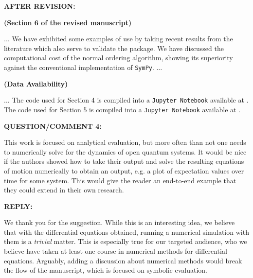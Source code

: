 \documentclass[12pt, a4paper]{article}
\newenvironment{revision}{%
\color{red}
}
{}
\newenvironment{revq}[1]{%
\newpage\phantomsection
\color{RoyalPurple}
\par
\textbf{QUESTION/COMMENT {#1}:}
\par
}
{\bigskip}
\newenvironment{reva}{%
\color{Black}
\par
\textbf{REPLY:}
\par
}
{\bigskip}
\newenvironment{revpost}{%
\textbf{{AFTER REVISION:}}
\par
}
{}
\begin{document}
\begin{revpost}
\textbf{(Section 6 of the revised manuscript)}

$\dots$ We have exhibited some examples of use by taking recent results from the literature which also serve to validate the package. We have discussed the computational cost of the normal ordering algorithm, \begin{revision}showing its superiority against the conventional implementation of \texttt{SymPy}.\end{revision} $\dots$

\textbf{(Data Availability)}

$\dots$ The code used for Section 4 is compiled into a \texttt{Jupyter Notebook} available at \href{https://github.com/hendry24/pyBoLaNO/blob/main/tutorial.ipynb}{}. \begin{revision}The code used for Section 5 is compiled into a \texttt{Jupyter Notebook} available at \href{https://github.com/hendry24/pyBoLaNO/blob/main/benchmarks.ipynb}{}.\end{revision}

\end{revpost}


\begin{revq}{4}
This work is focused on analytical evaluation, but more often than not one needs to numerically solve for the dynamics of open quantum systems. It would be nice if the authors showed how to take their output and solve the resulting equations of motion numerically to obtain an output, e.g. a plot of expectation values over time for some system. This would give the reader an end-to-end example that they could extend in their own research.
\end{revq}

\begin{reva}

We thank you for the suggestion. While this is an interesting idea, we believe that with the differential equations obtained, running a numerical simulation with them is a \emph{trivial} matter. This is especially true for our targeted audience, who we believe have taken at least one course in numerical methods for differential equations. Arguably, adding a discussion about numerical methods would break the flow of the manuscript, which is focused on symbolic evaluation. 

\end{reva}
\end{document}
